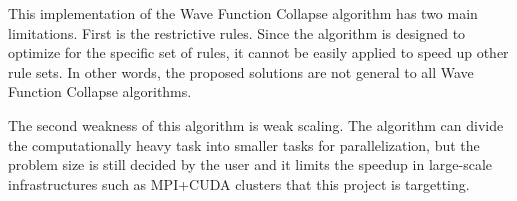 
This implementation of the Wave Function Collapse algorithm has two main limitations. First is the restrictive rules. Since the algorithm is designed to optimize for the specific set of rules, it cannot be easily applied to speed up other rule sets. In other words, the proposed solutions are not general to all Wave Function Collapse algorithms. 

The second weakness of this algorithm is weak scaling. The algorithm can divide the computationally heavy task into smaller tasks for parallelization, but the problem size is still decided by the user and it limits the speedup in large-scale infrastructures such as MPI+CUDA clusters that this project is targetting.